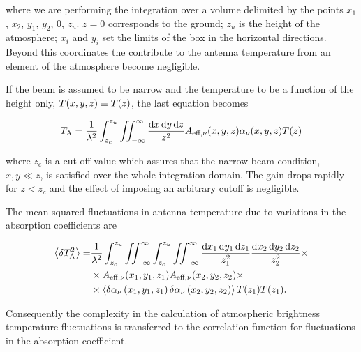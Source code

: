 where we are performing the integration over a volume delimited by the
points $x_1$, $x_2$, $y_1$, $y_2$, 0, $z_u$. $z = 0$ corresponds to
the ground; $z_u$ is the height of the atmosphere; $x_i$ and $y_i$ set the
limits of the box in the horizontal directions. Beyond this coordinates the
contribute to the antenna temperature from an element of the atmosphere
become negligible.

If the beam is assumed to be narrow and the temperature to be a function
of the height only, $T\qty(x,y,z) \equiv T\qty(z)$, the last equation
becomes

\begin{equation}
        T_\text{A} = \frac{1}{\lambda^2} \int^{z_u}_{z_c}
        \iint^\infty_{-\infty} \frac{\dd{x}\dd{y}\dd{z}}{z^2}
        A_{\text{eff},\nu}\qty(x,y,z)
        \alpha_\nu\qty(x,y,z) T\qty(z)
        \label{eq:fluctuations_t_antenna}
\end{equation}

where $z_c$ is a cut off value which assures that the narrow beam
condition, $x,y \ll z$, is satisfied over the whole integration domain.
The gain drops rapidly for $z < z_c$ and the effect of imposing an
arbitrary cutoff is negligible.

The mean squared fluctuations in antenna temperature due to variations in
the absorption coefficients are

\begin{equation}
        \begin{split}
                \expval{\var{T^2_\text{A}}} = & \frac{1}{\lambda^2}
                \int^{z_u}_{z_c}\iint^\infty_{-\infty}
                \int^{z_u}_{z_c}\iint^\infty_{-\infty}
                \frac{\dd{x_1}\dd{y_1}\dd{z_1}}{z^2_1}
                \frac{\dd{x_2}\dd{y_2}\dd{z_2}}{z^2_2} \times \\
                & \times A_{\text{eff},\nu}\qty(x_1,y_1,z_1)
                A_{\text{eff},\nu}\qty(x_2,y_2,z_2) \times \\
                & \times \expval{\var{\alpha_\nu}\qty(x_1,y_1,z_1)
                \var{\alpha_\nu}\qty(x_2,y_2,z_2)}
                T\qty(z_1)T\qty(z_1).
        \end{split}
        \label{eq:rms_t_antenna}
\end{equation}

Consequently the complexity in the calculation of atmospheric brightness
temperature fluctuations is transferred to the correlation function for
fluctuations in the absorption coefficient.

